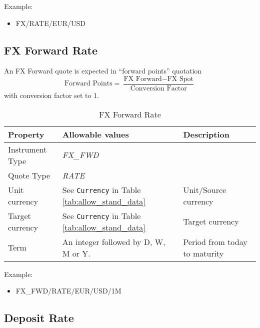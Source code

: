 Example:
\begin{itemize}
\item {FX/RATE/EUR/USD}
\end{itemize}

\subsection{FX Forward Rate}
\label{ss:fx_forward_rate}

An FX Forward quote is expected in ``forward points'' quotation
$$
\mbox{Forward Points} = \frac{\mbox{FX Forward} - \mbox{FX
    Spot}}{\mbox{Conversion Factor}}
$$ 
with conversion factor set to 1.
\begin{table}[H]
\centering
  \begin{tabular}{|p{3.5cm}|p{3.5cm}|p{6.5cm}|}
  \hline
    {\bf Property} & {\bf Allowable values} & {\bf Description}\\ \hline
    Instrument Type & \emph{FX\_FWD} & \\ \hline
    Quote Type & \emph{RATE} & \\ \hline
    Unit currency & See \lstinline!Currency! in Table \ref{tab:allow_stand_data} & Unit/Source currency\\ \hline
    Target currency & See \lstinline!Currency! in Table   \ref{tab:allow_stand_data} & Target currency\\  \hline
    Term & An integer followed by D, W, M or Y. & Period from today to  maturity\\ \hline
  \end{tabular}
  \caption{FX Forward Rate}
  \label{tab:fxfwd_quote}
\end{table}

Example:
\begin{itemize}
\item {FX\_FWD/RATE/EUR/USD/1M}
\end{itemize}

\subsection{Deposit Rate}

